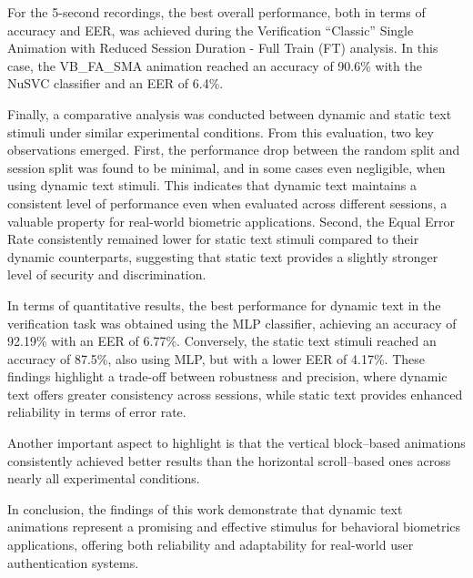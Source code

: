 \documentclass[12pt]{report}
\begin{document}
For the 5-second recordings, the best overall performance, both in terms of accuracy and EER, was achieved during the Verification “Classic” Single Animation with Reduced Session Duration - Full Train (FT) analysis. 
In this case, the VB\_FA\_SMA animation reached an accuracy of 90.6\% with the NuSVC classifier and an EER of 6.4\%.

Finally, a comparative analysis was conducted between dynamic and static text stimuli under similar experimental conditions.
From this evaluation, two key observations emerged.
First, the performance drop between the random split and session split was found to be minimal, and in some cases even negligible, when using dynamic text stimuli.
This indicates that dynamic text maintains a consistent level of performance even when evaluated across different sessions, a valuable property for real-world biometric applications.
Second, the Equal Error Rate consistently remained lower for static text stimuli compared to their dynamic counterparts, suggesting that static text provides a slightly stronger level of security and discrimination.

In terms of quantitative results, the best performance for dynamic text in the verification task was obtained using the MLP classifier, achieving an accuracy of 92.19\% with an EER of 6.77\%.
Conversely, the static text stimuli reached an accuracy of 87.5\%, also using MLP, but with a lower EER of 4.17\%.
These findings highlight a trade-off between robustness and precision, where dynamic text offers greater consistency across sessions, while static text provides enhanced reliability in terms of error rate.

Another important aspect to highlight is that the vertical block–based animations consistently achieved better results than the horizontal scroll–based ones across nearly all experimental conditions.

In conclusion, the findings of this work demonstrate that dynamic text animations represent a promising and effective stimulus for behavioral biometrics applications, offering both reliability and adaptability for real-world user authentication systems.

\newpage
\end{document}
